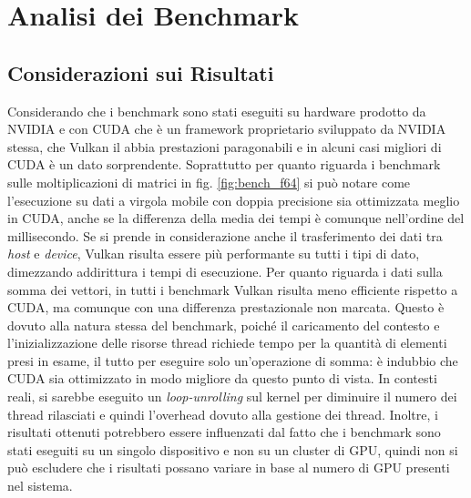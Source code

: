 \chapter{Analisi dei Benchmark}
\label{sec:analisys}

\section{Considerazioni sui Risultati}


Considerando che i benchmark sono stati eseguiti su hardware prodotto da NVIDIA e con \gls{CUDA} che è un framework proprietario sviluppato da NVIDIA stessa, che Vulkan il abbia prestazioni paragonabili e in alcuni casi migliori di \gls{CUDA} è un dato sorprendente. Soprattutto per quanto riguarda i benchmark sulle moltiplicazioni di matrici in fig. \ref{fig:bench_f64} si può notare come l'esecuzione su dati a virgola mobile con doppia precisione sia ottimizzata meglio in \gls{CUDA}, anche se la differenza della media dei tempi è comunque nell'ordine del millisecondo. Se si prende in considerazione anche il trasferimento dei dati tra \textit{host} e \textit{device}, Vulkan risulta essere più performante su tutti i tipi di dato, dimezzando addirittura i tempi di esecuzione. Per quanto riguarda i dati sulla somma dei vettori, in tutti i benchmark Vulkan risulta meno efficiente rispetto a \gls{CUDA}, ma comunque con una differenza prestazionale non marcata. Questo è dovuto alla natura stessa del benchmark, poiché il caricamento del contesto e l'inizializzazione delle risorse thread richiede tempo per la quantità di elementi presi in esame, il tutto per eseguire solo un'operazione di somma: è indubbio che \gls{CUDA} sia ottimizzato in modo migliore da questo punto di vista. In contesti reali, si sarebbe eseguito un \textit{loop-unrolling} sul kernel per diminuire il numero dei thread rilasciati e quindi l'overhead dovuto alla gestione dei thread. Inoltre, i risultati ottenuti potrebbero essere influenzati dal fatto che i benchmark sono stati eseguiti su un singolo dispositivo e non su un cluster di \gls{GPU}, quindi non si può escludere che i risultati possano variare in base al numero di \gls{GPU} presenti nel sistema.


